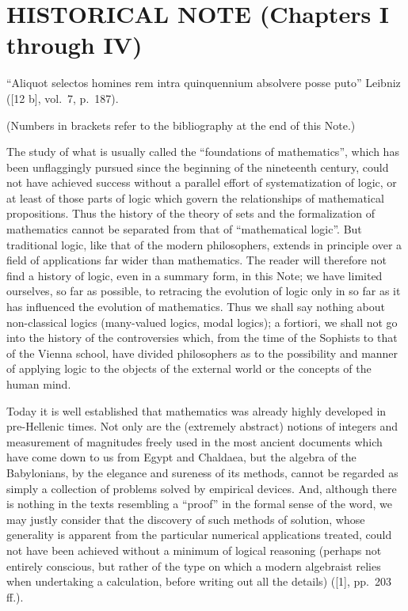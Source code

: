 \clearpage
\section*{HISTORICAL NOTE (Chapters I through IV)}
{}

``Aliquot selectos homines rem intra quinquennium absolvere posse puto'' Leibniz ({[}12 b{]}, vol.~7, p.~187).

(Numbers in brackets refer to the bibliography at the end of this Note.)

The study of what is usually called the ``foundations of mathematics'', which has been unflaggingly pursued since the beginning of the nineteenth century, could not have achieved success without a parallel effort of systematization of logic, or at least of those parts of logic which govern the relationships of mathematical propositions. Thus the history of the theory of sets and the formalization of mathematics cannot be separated from that of ``mathematical logic''. But traditional logic, like that of the modern philosophers, extends in principle over a field of applications far wider than mathematics. The reader will therefore not find a history of logic, even in a summary form, in this Note; we have limited ourselves, so far as possible, to retracing the evolution of logic only in so far as it has influenced the evolution of mathematics. Thus we shall say nothing about non-classical logics (many-valued logics, modal logics); a fortiori, we shall not go into the history of the controversies which, from the time of the Sophists to that of the Vienna school, have divided philosophers as to the possibility and manner of applying logic to the objects of the external world or the concepts of the human mind.

Today it is well established that mathematics was already highly developed in pre-Hellenic times. Not only are the (extremely abstract) notions of integers and measurement of magnitudes freely used in the most ancient documents which have come down to us from Egypt and Chaldaea, but the algebra of the Babylonians, by the elegance and sureness of its methods, cannot be regarded as simply a collection of problems solved by empirical devices. And, although there is nothing in the texts resembling a ``proof'' in the formal sense of the word, we may justly consider that the discovery of such methods of solution, whose generality is apparent from the particular numerical applications treated, could not have been achieved without a minimum of logical reasoning (perhaps not entirely conscious, but rather of the type on which a modern algebraist relies when undertaking a calculation, before writing out all the details) ({[}1{]}, pp.~203 ff.).


